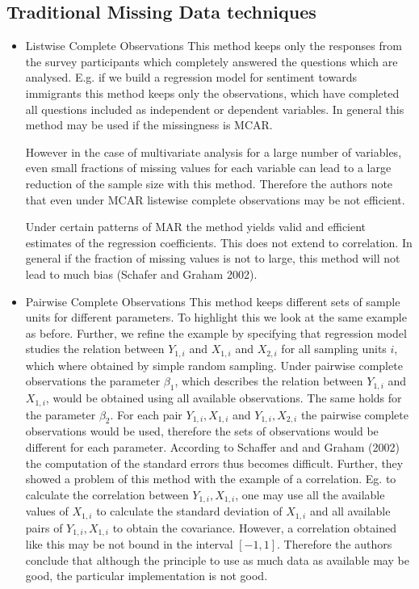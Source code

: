 \subsection{Traditional Missing Data techniques} 

\begin{itemize}
\item Listwise Complete Observations
This method keeps only the responses from the survey participants which completely answered the questions which are analysed. E.g. if we build a regression model for sentiment towards immigrants this method keeps only the observations, which have completed all questions included as independent or dependent variables.
In general this method may be used if the missingness is MCAR. \par However in the case of multivariate analysis for a large number of variables, even small fractions of missing values for each variable can lead to a large reduction of the sample size with this method. Therefore the authors note that even under MCAR listewise complete observations may be not efficient. \par Under certain patterns of MAR the method yields valid and efficient estimates of the regression coefficients. This does not extend to correlation. In general if the fraction of missing values is not to large, this method will not lead to much bias (Schafer and Graham 2002).  
\item Pairwise Complete Observations 
This method keeps different sets of sample units for different parameters. To highlight this we look at the same example as before. Further, we refine the example by specifying that regression model studies the relation between $Y_{1,i}$ and $X_{1,i}$ and $X_{2,i}$ for all sampling units $i$, which where obtained by simple random sampling. Under pairwise complete observations the parameter $\beta_1$, which describes the relation between  $Y_{1,i}$ and $X_{1,i}$, would be obtained using all available observations. The same holds for the parameter $\beta_2$. For each pair $Y_{1,i} , X_{1,i}$  and  $Y_{1,i} , X_{2,i}$ the pairwise complete observations would be used, therefore the sets of observations would be different for each parameter. According to Schaffer and and Graham (2002) the computation of the standard errors thus becomes difficult. Further, they showed a problem of this method with the example of a correlation. Eg. to calculate the correlation between $Y_{1,i} , X_{1,i}$, one may use all the available values of $X_{1,i}$ to calculate the standard deviation of $X_{1,i}$ and all available pairs of $Y_{1,i}, X_{1,i}$ to obtain the covariance. However, a correlation obtained like this may be not bound in the interval $[-1,1]$. Therefore the authors conclude that although the principle to use as much data as available may be good, the particular implementation is not good.

\end{itemize}
